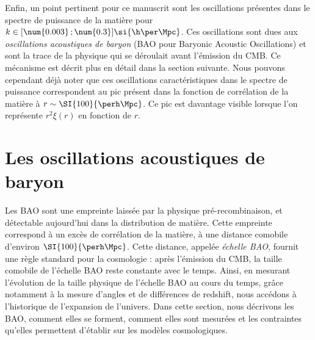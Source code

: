 Enfin, un point pertinent pour ce manuscrit sont les oscillations présentes dans le spectre de puissance de la matière pour $k \in [\num{0.003} \,; \num{0.3}] \si{\h\per\Mpc}$. Ces oscillations sont dues aux \emph{oscillations acoustiques de baryon} (BAO pour Baryonic Acoustic Oscillations) et sont la trace de la physique qui se déroulait avant l'émission du CMB. Ce mécanisme est décrit plus en détail dans la section suivante. Nous pouvons cependant déjà noter que ces oscillations caractéristiques dans le spectre de puissance correspondent au pic présent dans la fonction de corrélation de la matière à $r \sim \SI{100}{\perh\Mpc}$. Ce pic est davantage visible lorsque l'on représente $r^2\xi(r)$ en fonction de $r$.

\section{Les oscillations acoustiques de baryon}
\label{sec:bao}
Les BAO sont une empreinte laissée par la physique pré-recombinaison, et détectable aujourd'hui dans la distribution de matière. Cette empreinte correspond à un excès de corrélation de la matière, à une distance comobile d'environ $\SI{100}{\perh\Mpc}$. Cette distance, appelée \emph{échelle BAO}, fournit une règle standard pour la cosmologie : après l'émission du CMB, la taille comobile de l'échelle BAO reste constante avec le temps.
Ainsi, en mesurant l'évolution de la taille physique de l'échelle BAO au cours du temps, grâce notamment à la mesure d'angles et de différences de redshift, nous accédons à l'historique de l'expansion de l'univers.
Dans cette section, nous décrivons les BAO, comment elles se forment, comment elles sont mesurées et les contraintes qu'elles permettent d'établir sur les modèles cosmologiques.

